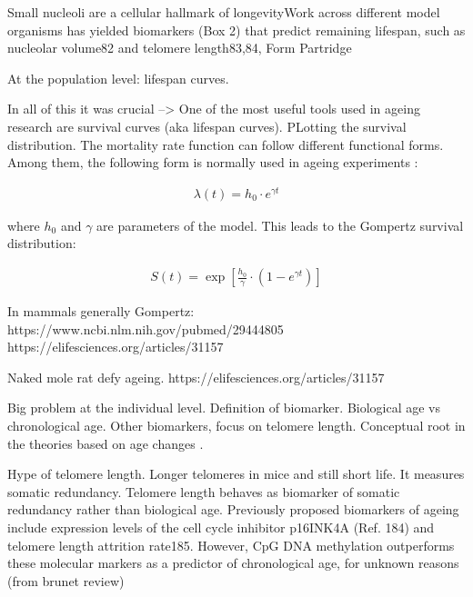 Small nucleoli are a cellular hallmark of longevityWork across different model organisms has yielded biomarkers (Box 2) that predict remaining lifespan, such as nucleolar volume82 and telomere length83,84, Form Partridge

At the population level: lifespan curves. 

In all of this it was crucial --> One of the most useful tools used in ageing research are survival curves (aka lifespan curves). PLotting the survival distribution. The mortality rate function can follow different functional forms. Among them, the following form is normally used in ageing experiments \cite{Witten1986}:

\begin{align}
\lambda(t) = h_0 \cdot e^{\gamma t}
\end{align}

where $h_0$ and $\gamma$ are parameters of the model. This leads to the Gompertz survival distribution:

\begin{align}
S(t) = \exp \left[ \frac{h_0}{\gamma} \cdot (1-e^{\gamma t}) \right]
\end{align}



In mammals generally Gompertz:
https://www.ncbi.nlm.nih.gov/pubmed/29444805
https://elifesciences.org/articles/31157 

Naked mole rat defy ageing. https://elifesciences.org/articles/31157


Big problem at the individual level. Definition of biomarker. Biological age vs chronological age. Other biomarkers, focus on telomere length. 
Conceptual root in the theories based on age changes \cite{Medvedev1990}.

Hype of telomere length. Longer telomeres in mice and still short life.
It measures somatic redundancy. Telomere length behaves as biomarker of somatic redundancy rather than biological age.
Previously proposed biomarkers of ageing include expression levels of the cell cycle inhibitor p16INK4A (Ref. 184) and telomere length attrition rate185. However, CpG DNA methylation outperforms these molecular markers as a predictor of chronological age, for unknown reasons (from brunet review)

